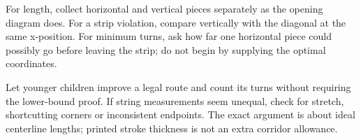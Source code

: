For length, collect horizontal and vertical pieces separately as the opening diagram does. For a strip violation, compare vertically with the diagonal at the same x-position. For minimum turns, ask how far one horizontal piece could possibly go before leaving the strip; do not begin by supplying the optimal coordinates.

Let younger children improve a legal route and count its turns without requiring the lower-bound proof. If string measurements seem unequal, check for stretch, shortcutting corners or inconsistent endpoints. The exact argument is about ideal centerline lengths; printed stroke thickness is not an extra corridor allowance.
